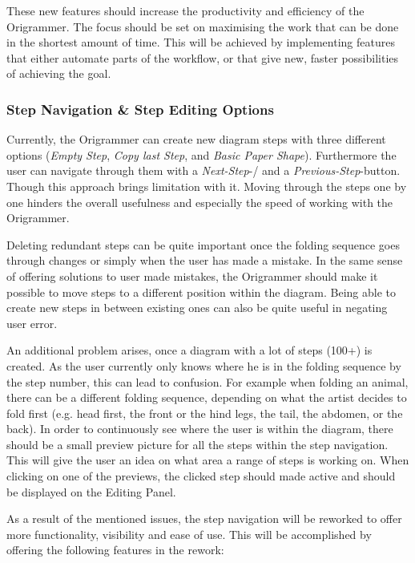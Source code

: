 These new features should increase the productivity and efficiency of the Origrammer. The focus should be set on maximising the work that can be done in the shortest amount of time. This will be achieved by implementing features that either automate parts of the workflow, or that give new, faster possibilities of achieving the goal.

\subsubsection{Step Navigation \& Step Editing Options}

Currently, the Origrammer can create new diagram steps with three different options (\emph{Empty Step}, \emph{Copy last Step}, and \emph{Basic Paper Shape}). Furthermore the user can navigate through them with a \emph{Next-Step}-/ and a \emph{Previous-Step}-button. Though this approach brings limitation with it. Moving through the steps one by one hinders the overall usefulness and especially the speed of working with the Origrammer.

Deleting redundant steps can be quite important once the folding sequence goes through changes or simply when the user has made a mistake. In the same sense of offering solutions to user made mistakes, the Origrammer should make it possible to move steps to a different position within the diagram. Being able to create new steps in between existing ones can also be quite useful in negating user error.

An additional problem arises, once a diagram with a lot of steps (100+) is created. As the user currently only knows where he is in the folding sequence by the step number, this can lead to confusion. For example when folding an animal, there can be a different folding sequence, depending on what the artist decides to fold first (e.g. head first, the front or the hind legs, the tail, the abdomen, or the back). In order to continuously see where the user is within the diagram, there should be a small preview picture for all the steps within the step navigation. This will give the user an idea on what area a range of steps is working on. When clicking on one of the previews, the clicked step should made active and should be displayed on the Editing Panel.

As a result of the mentioned issues, the step navigation will be reworked to offer more functionality, visibility and ease of use. This will be accomplished by offering the following features in the rework:

